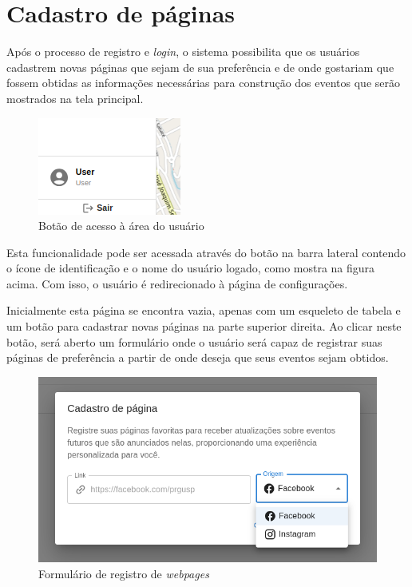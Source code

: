 \section{Cadastro de páginas}

Após o processo de registro e \textit{login}, o sistema possibilita que os
usuários cadastrem novas páginas que sejam de sua preferência e de onde
gostariam que fossem obtidas as informações necessárias para construção dos
eventos que serão mostrados na tela principal.

\begin{figure}[h]
    \centering
    \includegraphics[scale=.8]{figuras/userArea.png}
    \caption{Botão de acesso à área do usuário}
    \label{fig:enter-label}
\end{figure}

Esta funcionalidade pode ser acessada através do botão na barra lateral
contendo o ícone de identificação e o nome do usuário logado, como mostra na
figura acima. Com isso, o usuário é redirecionado à página de configurações.

Inicialmente esta página se encontra vazia, apenas com um esqueleto de tabela e
um botão para cadastrar novas páginas na parte superior direita. Ao clicar
neste botão, será aberto um formulário onde o usuário será capaz de registrar
suas páginas de preferência a partir de onde deseja que seus eventos sejam
obtidos.

\begin{figure}[h]
    \centering
    \includegraphics[scale=.5]{figuras/webpageRegisterModal.png}
    \caption{Formulário de registro de \textit{webpages}}
    \label{fig:enter-label}
\end{figure}

